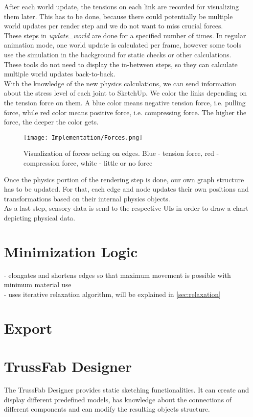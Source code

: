 After each world update, the tensions on each link are recorded for visualizing them later. This has to be done, because there could potentially be multiple world updates per render step and we do not want to miss crucial forces.\\
These steps in \textit{update\_world} are done for a specified number of times. In regular animation mode, one world update is calculated per frame, however some tools use the simulation in the background for static checks or other calculations. These tools do not need to display the in-between steps, so they can calculate multiple world updates back-to-back.\\
With the knowledge of the new physics calculations, we can send information about the stress level of each joint to SketchUp. We color the links depending on the tension force on them. A blue color means negative tension force, i.e. pulling force, while red color means positive force, i.e. compressing force. The higher the force, the deeper the color gets.\\
\begin{figure}[h!]
    \texttt{[image: Implementation/Forces.png]}
    \centering
    \caption{Visualization of forces acting on edges. Blue - tension force, red - compression force, white - little or no force}
    \label{fig:sketchup_objects}
\end{figure}
Once the physics portion of the rendering step is done, our own graph structure has to be updated. For that, each edge and node updates their own positions and transformations based on their internal physics objects.\\
As a last step, sensory data is send to the respective UIs in order to draw a chart depicting physical data.
\section{Minimization Logic}
- elongates and shortens edges so that maximum movement is possible with minimum material use\\
- uses iterative relaxation algorithm, will be explained in \ref{sec:relaxation}

\section{Export}

\section{TrussFab Designer}
The TrussFab Designer provides static sketching functionalities. It can create and display different predefined models, has knowledge about the connections of different components and can modify the resulting objects structure.

